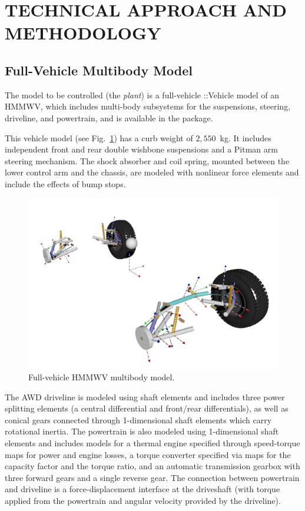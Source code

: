 \documentclass[12pt,twocolumn]{article}
\newcommand{\CHRONO}{{\sffamily{{Chrono}}}}
\newcommand{\ChronoVehicle}{{\sffamily{Chrono}}::Vehicle}
\begin{document}

\section{TECHNICAL APPROACH AND METHODOLOGY}\label{s:methodology}

\subsection{Full-Vehicle Multibody Model}\label{ss:FullVehicleModel}

The model to be controlled (the {\em plant}) is a full-vehicle {\ChronoVehicle} model of an HMMWV, which includes multi-body subsystems for the suspensions, steering, driveline, and powertrain, and is available in the {\CHRONO} package.

This vehicle model (see Fig.~\ref{fig:hmmwv}) has a curb weight of $2,550$~kg.
%
It includes independent front and rear double wishbone suspensions and a Pitman arm steering mechanism. The shock absorber and coil spring, mounted between the lower control arm and the chassis, are modeled with {\CHRONO} nonlinear force elements and include the effects of bump stops.
%
\begin{figure}
	\centering
	\includegraphics[width=\columnwidth]{Figs/hmmwv_bodies.png}
	\caption{\small Full-vehicle HMMWV multibody model.}  
	\label{fig:hmmwv}
\end{figure}

The AWD driveline is modeled using {\CHRONO} shaft elements and includes three power splitting elements (a central differential and front/rear differentials), as well as conical gears connected through 1-dimensional shaft elements which carry rotational inertia. 
%
The powertrain is also modeled using 1-dimensional shaft elements and includes models for a thermal engine specified through speed-torque maps for power and engine losses, a torque converter specified via maps for the capacity factor and the torque ratio, and an automatic transmission gearbox with three forward gears and a single reverse gear.
%
The connection between powertrain and driveline is a force-displacement interface at the driveshaft (with torque applied from the powertrain and angular velocity provided by the driveline).
\end{document}
